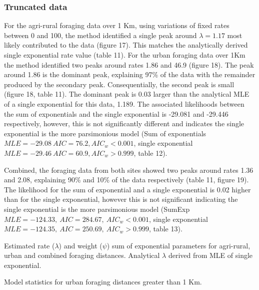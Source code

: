 \documentclass[11pt,usenames,dvipsnames,a4paper]{article}
\begin{document}
\subsubsection{Truncated data}

\begin{linenumbers}
\hspace{\parindent}
For the agri-rural foraging data over 1 Km, using variations of fixed rates between 0 and 100, the method identified a single peak around $\lambda = 1.17$ most likely contributed to the data (figure 17). This matches the analytically derived single exponential rate value (table 11). For the urban foraging data over 1Km the method identified two peaks around rates 1.86 and 46.9 (figure 18). The peak around 1.86 is the dominant peak, explaining 97\% of the data with the remainder produced by the secondary peak. Consequentially, the second peak is small (figure 18, table 11). The dominant peak is 0.03 larger than the analytical MLE of a single exponential for this data, 1.189. The associated likelihoods between the sum of exponentials and the single exponential is -29.081 and -29.446 respectively, however, this is not significantly different and indicates the single exponential is the more parsimonious model (Sum of exponentials $MLE = -29.08\ AIC = 76.2, AIC_w < 0.001$, single exponential $MLE = -29.46\ AIC = 60.9, AIC_w > 0.999$, table 12). 

Combined, the foraging data from both sites showed two peaks around rates 1.36 and 2.08, explaining 90\% and 10\% of the data respectively (table 11, figure 19). The likelihood for the sum of exponential and a single exponential is 0.02 higher than for the single exponential, however this is not significant indicating the single exponential is the more parsimonious model (SumExp $MLE = -124.33,\ AIC = 284.67,\ AIC_w < 0.001$, single exponential $MLE = -124.35,\ AIC = 250.69,\ AIC_w > 0.999$, table 13).
\end{linenumbers}

\begin{table}[H]
	\centering
	\caption{Estimated rate ($\lambda$) and weight ($\psi$) sum of exponential parameters for agri-rural, urban and combined foraging distances. Analytical $\lambda$ derived from MLE of single exponential.}
	
\end{table}

\begin{table}[H]
	\centering
	\caption{Model statistics for urban foraging distances greater than 1 Km.}
	
\end{table}
\end{document}
